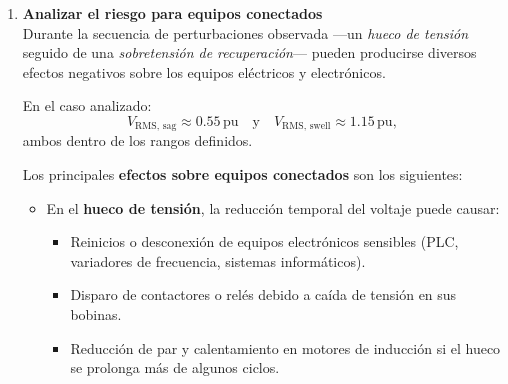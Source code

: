 \documentclass{article}
\begin{document}
\begin{enumerate}
\begin{enumerate}
    \item \textbf{Medir duraciones y magnitudes de cada fase} \\
    De la observación directa de las gráficas se obtienen las siguientes magnitudes y duraciones:
    \[
    \begin{array}{lcc}
    \textbf{Fase} & \textbf{Duración (ms)} & \textbf{Valor RMS (V)} \\ \hline
    \text{Nominal inicial} & 0\text{--}50 & 230 \\
    \text{Hueco (sag)} & 50\text{--}150 & 125 \\
    \text{Sobretensión (swell)} & 150\text{--}270 & 265 \\
    \text{Retorno nominal} & 270\text{--}600 & 230 \\
    \end{array}
    \]
    Estas mediciones coinciden con los valores teóricos esperados, validando el correcto funcionamiento del cálculo de RMS deslizante.
\end{enumerate}
   
    \item \textbf{Analizar el riesgo para equipos conectados} \\
   Durante la secuencia de perturbaciones observada —un \textit{hueco de tensión} seguido de una \textit{sobretensión de recuperación}— pueden producirse diversos efectos negativos sobre los equipos eléctricos y electrónicos.

En el caso analizado:
\[
V_{\text{RMS, sag}} \approx 0.55\,\text{pu} \quad \text{y} \quad V_{\text{RMS, swell}} \approx 1.15\,\text{pu},
\]
ambos dentro de los rangos definidos.

Los principales \textbf{efectos sobre equipos conectados} son los siguientes:
\begin{itemize}
    \item En el \textbf{hueco de tensión}, la reducción temporal del voltaje puede causar:
    \begin{itemize}
        \item Reinicios o desconexión de equipos electrónicos sensibles (PLC, variadores de frecuencia, sistemas informáticos).
        \item Disparo de contactores o relés debido a caída de tensión en sus bobinas.
        \item Reducción de par y calentamiento en motores de inducción si el hueco se prolonga más de algunos ciclos.
    \end{itemize}


\end{itemize}
\end{enumerate}
\end{document}
